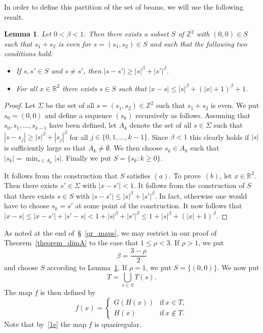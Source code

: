 \documentclass[12pt,a4paper]{amsart}
\theoremstyle{plain}
\newtheorem{lemma}[theorem]{Lemma}
\theoremstyle{definition}
\theoremstyle{remark}
\def\R{\mathbb R}
\def\Z{\mathbb Z}
\numberwithin{equation}{section}
\begin{document}
In order to define this partition of the set of beams, 
we will use the following result.
\begin{lemma} \label{lemma11}
Let $0<\beta<1$.
Then there exists a subset $S$ of $\Z^2$ with $(0,0)\in S$ such that 
$s_1+s_2$ is even for $s=(s_1,s_2)\in S$ and such that
the following two conditions hold:
\begin{itemize} 
\item[$(a)$] If $s,s'\in S$ and $s\neq s'$, then $|s-s'|\geq |s|^\beta+|s'|^\beta$.
\item[$(b)$] For all $x\in\R^2$ there exists $s\in S$ such that
$|x-s|\leq |s|^\beta+(|x|+1)^\beta +1$.
\end{itemize} 
\end{lemma} 
\begin{proof} 
Let $\Sigma$ be the set of all $s=(s_1,s_2)\in\Z^2$ such that $s_1+s_2$ is even.
We put $s_0=(0,0)$ and define a sequence $(s_k)$ recursively as follows.
Assuming that $s_0,s_1,\dots,s_{k-1}$ have been defined, let $A_k$ denote the 
set of all $s\in\Sigma$ such that $|s-s_j|\geq |s|^\beta+|s_j|^\beta$ for 
all $j\in\{0,1,\dots,k-1\}$. Since $\beta<1$ this clearly holds if $|s|$
is sufficiently large so that $A_k\neq\emptyset$. We then choose $s_k\in A_k$ such that 
$|s_k|=\min_{s\in A_k}|s|$. Finally we put $S=\{s_k\colon k\geq 0\}$.

It follows from the construction that $S$ satisfies $(a)$. To prove~$(b)$,
let $x\in\R^2$. Then there exists $s'\in\Sigma$ with $|x-s'|<1$. 
It follows from the construction of $S$ that there exists $s\in S$ 
with $|s-s'|\leq |s|^\beta+|s'|^\beta$. In fact, otherwise one would have 
to choose $s_k=s'$ at some point of the construction. It now follows 
that $|x-s|\leq |x-s'|+|s'-s|< 1+|s|^\beta+|s'|^\beta\leq 1+|s|^\beta+(|x|+1)^\beta$.
\end{proof} 

As noted at the end of~\S~\ref{qr_maps}, we may restrict in our proof of 
Theorem~\ref{theorem_dimA} to the case that $1\leq \rho<3$.
If $\rho>1$, we put 
\begin{equation}\label{def-beta}
\beta=\frac{3-\rho}{2}
\end{equation}
 and choose $S$ according to Lemma~\ref{lemma11}.
If $\rho=1$, we put $S=\{(0,0)\}$. We now put
\begin{equation}\label{1f}
T=\bigcup_{s\in S} T(s) .
\end{equation}
The map $f$ is then defined by
\begin{equation}\label{1g}
f(x)=
\begin{cases}
G(H(x)) &\text{if}\ x\in T,\\
H(x) &\text{if}\ x\notin T.
\end{cases}
\end{equation}
Note that by~\eqref{1e} the map $f$ is quasiregular.
\end{document}
